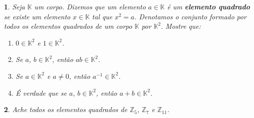 \documentclass[12pt]{exam}
\newtheorem{exercicio}{}
\newcommand{\integer}{\mathbb{Z}}
\newcommand{\cp}[1]{\mathbb{#1}}
\begin{document}
\begin{exercicio}
  Seja $\cp{K}$ um corpo. Dizemos que um elemento $a \in \cp{K}$ \'e um \textbf{elemento quadrado} se existe um elemento $x \in \cp{K}$ tal que $x^2 = a$. Denotamos o conjunto formado por todos os elementos quadrados de um corpo $\cp{K}$ por $\cp{K}^2$. Mostre que:
  \begin{enumerate}[label={\alph*})]
    \item $0 \in \cp{K}^2$ e $1 \in \cp{K}^2$.
    \item Se $a$, $b \in \cp{K}^2$, ent\~ao $ab \in \cp{K}^2$.
    \item Se $a \in \cp{K}^2$ e $a \ne 0$, ent\~ao $a^{-1} \in \cp{K}^2$.
    \item \'E verdade que se $a$, $b \in \cp{K}^2$, ent\~ao $a + b \in \cp{K}^2$.
  \end{enumerate}
\end{exercicio}

\begin{exercicio}
  Ache todos os elementos quadrados de $\integer_5$, $\integer_7$ e $\integer_{11}$.
\end{exercicio}

% 
\end{document}
